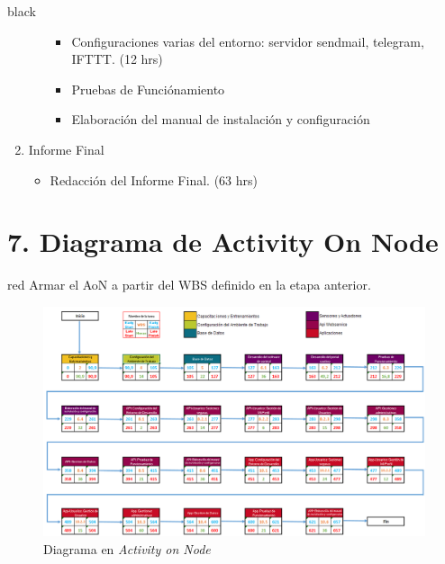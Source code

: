 \documentclass[11pt]{charter}
\begin{document}
\begin{consigna}{black}
\begin{enumerate}
\begin{enumerate}
\begin{itemize}
			\item Configuraciones varias del entorno: servidor sendmail, telegram, IFTTT. (12 hrs)
			\item Pruebas de Funciónamiento
			\item Elaboración del manual de instalación y configuración
		\end{itemize}
	\end{enumerate}	
\item Informe Final
	\begin{itemize}
		\item Redacción del Informe Final. (63 hrs)
	\end{itemize}
\end{enumerate}

%

\end{consigna}

\section{7. Diagrama de Activity On Node}
\label{sec:AoN}

\begin{consigna}{red}
Armar el AoN a partir del WBS definido en la etapa anterior. 



\end{consigna}

\begin{figure}[htpb]
\centering 
\includegraphics[width=.8\textwidth]{./Figuras/AoN.png}
\caption{Diagrama en \textit{Activity on Node}}
\label{fig:AoN}
\end{figure}
\end{document}
